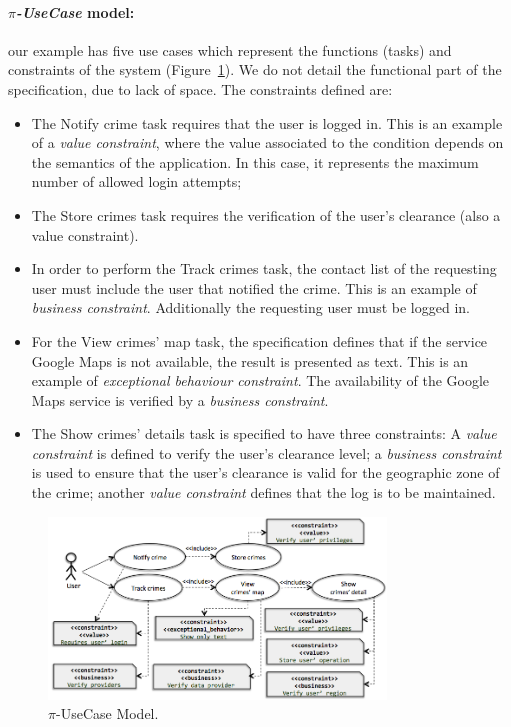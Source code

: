 \documentclass{llncs}
\theoremstyle{plain}
\theoremstyle{plain}
\theoremstyle{plain}
\begin{document}
\paragraph*{\textit{$\pi$-UseCase} model:} 
our example has five use cases which represent the
 functions (tasks) and constraints of the system (Figure~\ref{fig:piUC}). 
We do not detail the functional part of the specification, due to lack of space.
The constraints defined are: 
\begin{itemize}
  \item The \textsf{Notify crime} task requires that the user is logged in. 
  This is an example of a \textit{value constraint}, where the value associated to the condition depends on the semantics of the application.
  In this case, it represents the maximum number of allowed login attempts;
\item The \textsf{Store crimes} task requires the verification of the user's clearance (also a value constraint). 
\item In order to perform the \textsf{Track crimes} task,
the contact list of the requesting user must include the user that notified the crime.
This is an example of \textit{business constraint}.
Additionally the requesting user must be logged in.
\item  For the \textsf{View crimes' map} task, the specification defines that if the service \textsf{Google Maps}  is not available, the result is presented as text. This is an example of \textit{exceptional behaviour constraint}. 
The availability of the \textsf{Google Maps} service is verified by a \textit{business constraint}.
 \item The \textsf{Show crimes' details} task is specified to have three constraints: A \textit{value constraint} is defined to verify the user's clearance level; a \textit{business constraint} is used to ensure that the user's clearance is valid for the geographic zone of the crime; another \textit{value constraint} defines that the log is to be maintained.
\end{itemize}
\begin{figure}[t]
\centering
\includegraphics[width=0.8\textwidth]{piUseCase.png}
\caption{$\pi$-UseCase Model.}
\label{fig:piUC}
\end{figure}
\end{document}
